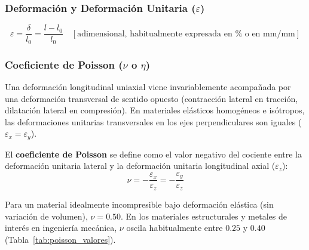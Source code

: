 \subsubsection{Deformación y Deformación Unitaria ($\varepsilon$)}

\begin{equation}
    \varepsilon = \frac{\delta}{l_0} = \frac{l - l_0}{l_0} \quad [\text{adimensional, habitualmente expresada en } \% \text{ o en } \text{mm}/\text{mm}]
    \label{eq:deformacion_unitaria}
\end{equation}

\subsubsection{Coeficiente de Poisson ($\nu$ o $\eta$)}
Una deformación longitudinal uniaxial viene invariablemente acompañada por una deformación transversal de sentido opuesto (contracción lateral en tracción, dilatación lateral en compresión). En materiales elásticos homogéneos e isótropos, las deformaciones unitarias transversales en los ejes perpendiculares son iguales ($\varepsilon_x = \varepsilon_y$).

El \textbf{coeficiente de Poisson} se define como el valor negativo del cociente entre la deformación unitaria lateral y la deformación unitaria longitudinal axial ($\varepsilon_z$):
\begin{equation}
    \nu = -\frac{\varepsilon_x}{\varepsilon_z} = -\frac{\varepsilon_y}{\varepsilon_z}
    \label{eq:poisson_ratio}
\end{equation}

Para un material idealmente incompresible bajo deformación elástica (sin variación de volumen), $\nu = 0.50$. En los materiales estructurales y metales de interés en ingeniería mecánica, $\nu$ oscila habitualmente entre $0.25$ y $0.40$ (Tabla~\ref{tab:poisson_valores}).

